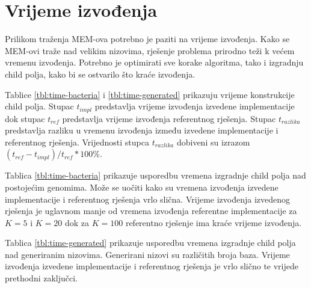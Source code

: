 \documentclass[times, utf8, seminar, numeric]{fer}
\begin{document}
\section{Vrijeme izvođenja}
Prilikom traženja MEM-ova potrebno je paziti na vrijeme izvođenja. Kako se MEM-ovi traže nad velikim nizovima, rješenje problema prirodno teži k većem vremenu izvođenja. Potrebno je optimirati sve korake algoritma, tako i izgradnju child polja, kako bi se ostvarilo što kraće izvođenja. 

Tablice \ref{tbl:time-bacteria} i \ref{tbl:time-generated} prikazuju vrijeme konstrukcije child polja. Stupac $t_{impl}$  predstavlja vrijeme izvođenja izvedene implementacije dok stupac $t_{ref}$ predstavlja vrijeme izvođenja referentnog rješenja. Stupac $t_{razlika}$ predstavlja razliku u vremenu izvođenja između izvedene implementacije i referentnog rješenja. Vrijednosti stupca $t_{razlika}$ dobiveni su izrazom $(t_{ref} - t_{impl}) / t_{ref} * 100\%$.

Tablica \ref{tbl:time-bacteria} prikazuje usporedbu vremena izgradnje child polja nad postojećim genomima. Može se uočiti kako su vremena izvođenja izvedene implementacije i referentnog rješenja vrlo slična. Vrijeme izvođenja izvedenog rješenja je uglavnom manje od vremena izvođenja referentne implementacije za $K=5$ i $K=20$ dok za $K=100$ referentno rješenje ima kraće vrijeme izvođenja.

Tablica \ref{tbl:time-generated} prikazuje usporedbu vremena izgradnje child polja nad generiranim nizovima. Generirani nizovi su različitih broja baza. Vrijeme izvođenja izvedene implementacije i referentnog rješenja je vrlo slično te vrijede prethodni zaključci.
 
\end{document}
